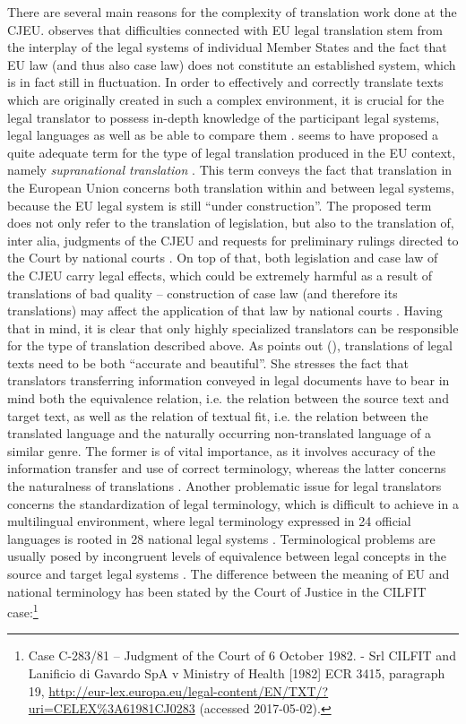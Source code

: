 \documentclass[output=paper]{langsci/langscibook}
\begin{document}
There are several main reasons for the complexity of translation work done at the CJEU. \citet[70]{Kjær2007} observes that difficulties connected with EU legal translation stem from the interplay of the legal systems of individual Member States and the fact that EU law (and thus also case law) does not constitute an established system, which is in fact still in fluctuation. In order to effectively and correctly translate texts which are originally created in such a complex environment, it is crucial for the legal translator to possess in-depth knowledge of the participant legal systems, legal languages as well as be able to compare them \citep[71]{Kjær2007}. \citeauthor{Kjær2007} seems to have proposed a quite adequate term for the type of legal translation produced in the EU context, namely \textit{supranational translation} \citep[76]{Kjær2007}. This term conveys the fact that translation in the European Union concerns both translation within and between legal systems, because the EU legal system is still “under construction”. The proposed term does not only refer to the translation of legislation, but also to the translation of, inter alia, judgments of the CJEU and requests for preliminary rulings directed to the Court by national courts \citep[77]{Kjær2007}. On top of that, both legislation and case law of the CJEU carry legal effects, which could be extremely harmful as a result of translations of bad quality – construction of case law (and therefore its translations) may affect the application of that law by national courts \citep[492]{McAuliffe2013a}. Having that in mind, it is clear that only highly specialized translators can be responsible for the type of translation described above. As \citeauthor{Biel2011a} points out (\citeyear[25]{Biel2011a}), translations of legal texts need to be both “accurate and beautiful”. She stresses the fact that translators transferring information conveyed in legal documents have to bear in mind both the equivalence relation, i.e. the relation between the source text and target text, as well as the relation of textual fit, i.e. the relation between the translated language and the naturally occurring non-translated language of a similar genre. The former is of vital importance, as it involves accuracy of the information transfer and use of correct terminology, whereas the latter concerns the naturalness of translations \citep{Biel2011a}. Another problematic issue for legal translators concerns the standardization of legal terminology, which is difficult to achieve in a multilingual environment, where legal terminology expressed in 24 official languages is rooted in 28 national legal systems \citep[75, 79]{Biel2011a}. Terminological problems are usually posed by incongruent levels of equivalence between legal concepts in the source and target legal systems \citep[16]{PrietoRamos2011}. The difference between the meaning of EU and national terminology has been stated by the Court of Justice in the CILFIT case:\footnote{Case C-283/81 – Judgment of the Court of 6 October 1982. - Srl CILFIT and Lanificio di Gavardo SpA v Ministry of Health [1982] ECR 3415, paragraph 19, \url{http://eur-lex.europa.eu/legal-content/EN/TXT/?uri=CELEX\%3A61981CJ0283} (accessed 2017-05-02).}
\end{document}

